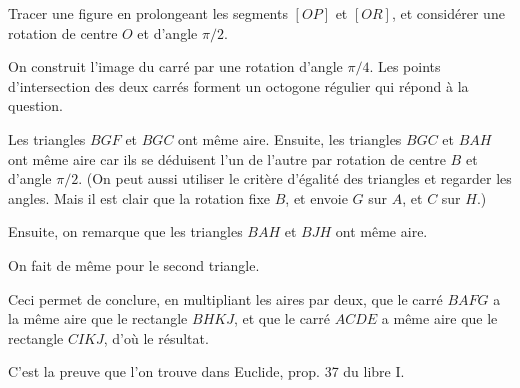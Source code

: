 \begin{Soln}{57}


\begin{center}
\end{center}
\end{Soln}
\begin{Soln}{58}
Tracer une figure en prolongeant les segments $[OP]$ et $[OR]$, et considérer une rotation de centre $O$ et d'angle $\pi/2$.
\end{Soln}
\begin{Soln}{61}
On construit l'image du carré par une rotation d'angle $\pi/4$. Les points d'intersection des deux carrés forment un octogone régulier qui répond à la question.
\end{Soln}
\begin{Soln}{62}
Les triangles $BGF$ et $BGC$ ont même aire. Ensuite, les triangles $BGC$ et $BAH$ ont même aire car ils se déduisent l'un de l'autre par rotation de centre $B$ et d'angle $\pi/2$. (On peut aussi utiliser le critère d'égalité des triangles et regarder les angles. Mais il est clair que la rotation fixe $B$, et envoie $G$ sur $A$, et $C$ sur $H$.)

Ensuite, on remarque que les triangles $BAH$ et $BJH$ ont même aire.

On fait de même pour le second triangle.

Ceci permet de conclure, en multipliant les aires par deux,  que le carré $BAFG$ a la même aire que le rectangle $BHKJ$, et que le carré $ACDE$ a même aire que le rectangle $CIKJ$, d'où le résultat.

C'est la preuve que l'on trouve dans Euclide, prop. 37 du libre I.
\end{Soln}
